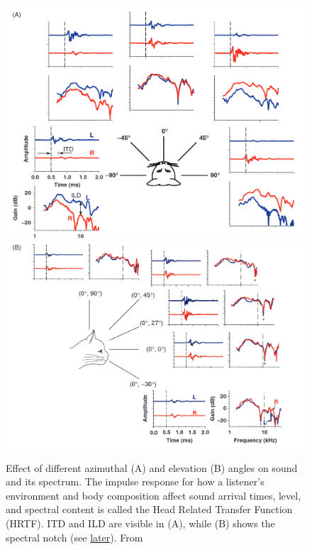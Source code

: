 \documentclass[11pt,a4paper]{article}
\begin{document}
\begin{figure}
    \centering
    \includegraphics[width=0.45\linewidth]{Images/hrtf-cat-azim.png}
    \includegraphics[width=0.44\linewidth]{Images/hrtf-elev.png}
    
    \caption{Effect of different azimuthal (A) and elevation (B) angles on sound and its spectrum. The impulse response for how a listener's environment and body composition affect sound arrival times, level, and spectral content is called the Head Related Transfer Function (HRTF). ITD and ILD are visible in (A), while (B) shows the spectral notch (see \protect\hyperlink{text:spectral-notch}{later}). From \cite{yinNeuralMechanismsBinaural2019}
    \label{fig:intro-hrtf}}
\end{figure}
\end{document}
